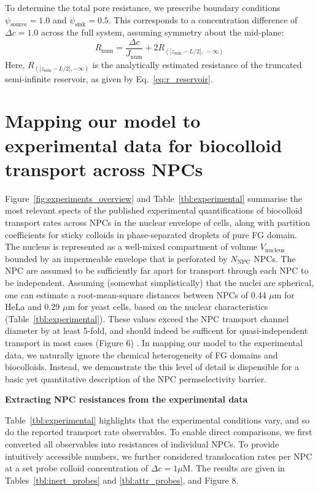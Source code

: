\documentclass[10pt, a4paper, twocolumn]{article}
\begin{document}
To determine the total pore resistance, we prescribe boundary conditions $\psi_{\text{source}} = 1.0$ and $\psi_{\text{sink}} = 0.5$.
This corresponds to a concentration difference of $\Delta c = 1.0$ across the full system, assuming symmetry about the mid-plane:
\begin{equation}
    R_{\text{num}} = \frac{\Delta c}{J_{\text{num}}} + 2 R_{\left(\left|z_{\text{min}} - L/2\right|,\ -\infty\right)}
\end{equation}
Here, $R_{(|z_{\text{min}} - L/2|, -\infty)}$ is the analytically estimated resistance of the truncated semi-infinite reservoir, as given by Eq.~\eqref{eq:r_reservoir}.


\pagebreak
\section{Mapping our model to experimental data for biocolloid transport across NPCs}

Figure~\ref{fig:experiments_overview} and Table~\ref{tbl:experimental} summarise the most relevant spects of the published experimental quantifications of biocolloid transport rates across NPCs in the nuclear envelope of cells, along with partition coefficients for sticky colloids in phase-separated droplets of pure FG domain. 
The nucleus is represented as a well-mixed compartment of volume $V_\text{nucleus}$ bounded by an impermeable envelope that is perforated by $N_\text{NPC}$ NPCs.
The NPC are assumed to be sufficiently far apart for transport through each NPC to be independent.
Assuming (somewhat simplistically) that the nuclei are spherical, one can estimate a root-mean-square distances between NPCs of 0.44 $\mu$m for HeLa and 0.29 $\mu$m for yeast cells, based on the nuclear characteristics (Table~\ref{tbl:experimental}).
These values exceed the NPC transport channel diameter by at least 5-fold, and should indeed be sufficent for quasi-independent transport in most cases (Figure 6) \cite{Fabrikant1985}.
In mapping our model to the experimental data, we naturally ignore the chemical heterogeneity of FG domains and biocolloids.
Instead, we demonstrate the this level of detail is dispensible for a basic yet quantitative description of the NPC permselectivity barrier.

\bigskip
\textbf{Extracting NPC resistances from the experimental data}
    
Table~\ref{tbl:experimental} highlights that the experimental conditions vary, and so do the reported transport rate observables.
To enable direct comparisons, we first converted all observables into resistances of individual NPCs.
To provide intuitively accessible numbers, we further considered translocation rates per NPC at a set probe colloid concentration of $\Delta c = 1 \mu \text{M}$.
The results are given in Tables~\ref{tbl:inert_probes} and \ref{tbl:attr_probes}, and Figure 8.
\end{document}
